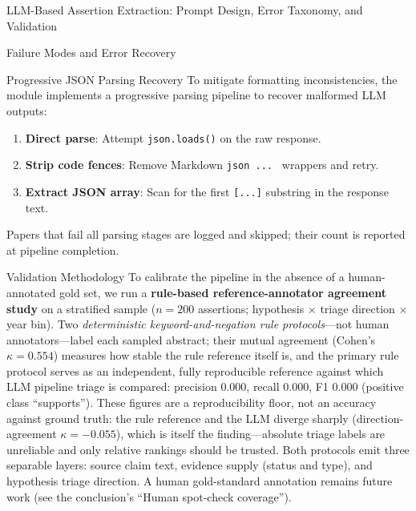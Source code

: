 \documentclass[
  ignorenonframetext,
]{beamer}
\providecommand{\tightlist}{%
  \setlength{\itemsep}{0pt}\setlength{\parskip}{0pt}}
\begin{document}
\begin{frame}{LLM-Based Assertion Extraction:
Prompt Design, Error Taxonomy, and Validation
\label{sec:extraction_pipeline}}
\begin{block}{Failure Modes and Error Recovery}
\begin{block}{Progressive JSON Parsing Recovery}
\protect{}\label{progressive-json-parsing-recovery}
To mitigate formatting inconsistencies, the module implements a
progressive parsing pipeline to recover malformed LLM outputs:

\begin{enumerate}
\tightlist
\item
  \textbf{Direct parse}: Attempt \texttt{json.loads()} on the raw
  response.
\item
  \textbf{Strip code fences}: Remove Markdown
  \texttt{\textasciigrave{}\textasciigrave{}\textasciigrave{}json\ ...\ \textasciigrave{}\textasciigrave{}\textasciigrave{}}
  wrappers and retry.
\item
  \textbf{Extract JSON array}: Scan for the first \texttt{{[}...{]}}
  substring in the response text.
\end{enumerate}

Papers that fail all parsing stages are logged and skipped; their count
is reported at pipeline completion.
\end{block}
\end{block}

\begin{block}{Validation Methodology}
\protect{}\label{validation-methodology}
To calibrate the pipeline in the absence of a human-annotated gold set,
we run a \textbf{rule-based reference-annotator agreement study} on a
stratified sample (\(n = 200\) assertions; hypothesis \(\times\) triage
direction \(\times\) year bin). Two \emph{deterministic
keyword-and-negation rule protocols}---not human annotators---label each
sampled abstract; their mutual agreement (Cohen's \(\kappa = 0.554\))
measures how stable the rule reference itself is, and the primary rule
protocol serves as an independent, fully reproducible reference against
which LLM pipeline triage is compared: precision 0.000, recall 0.000, F1
0.000 (positive class ``supports''). These figures are a reproducibility
floor, not an accuracy against ground truth: the rule reference and the
LLM diverge sharply (direction-agreement \(\kappa = -0.055\)), which is
itself the finding---absolute triage labels are unreliable and only
relative rankings should be trusted. Both protocols emit three separable
layers: source claim text, evidence supply (status and type), and
hypothesis triage direction. A human gold-standard annotation remains
future work (see the conclusion's ``Human spot-check coverage'').


\end{block}
\end{frame}
\end{document}
